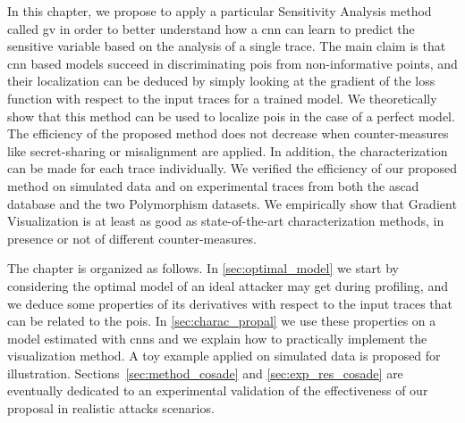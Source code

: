 In this chapter, we propose to apply a particular Sensitivity Analysis method called \gls{gv} in order to better understand how a \gls{cnn} can learn to predict the sensitive variable based on the analysis of a single trace.
The main claim is that \gls{cnn} based models succeed in discriminating \glspl{poi} from non-informative points, and their localization can be deduced by simply looking at the gradient of the loss function with respect to the input traces for a trained model.
We theoretically show that this method can be used to localize \glspl{poi} in the case of a perfect model.
The efficiency of the proposed method does not decrease when counter-measures like secret-sharing or misalignment are applied.
In addition, the characterization can be made for each trace individually. 
We verified the efficiency of our proposed method on simulated data and on experimental traces from both the \gls{ascad} database and the two Polymorphism datasets.
We empirically show that Gradient Visualization is at least as good as state-of-the-art characterization methods, in presence or not of different counter-measures.

The chapter is organized as follows. 
In \autoref{sec:optimal_model} we start by considering the optimal model of an ideal attacker may get during profiling, and we deduce some properties of its derivatives with respect to the input traces that can be related to the \glspl{poi}. 
In \autoref{sec:charac_propal} we use these properties on a model estimated with \glspl{cnn} and we explain how to practically implement the visualization method. 
A toy example applied on simulated data is proposed for illustration. 
Sections~\ref{sec:method_cosade} and \ref{sec:exp_res_cosade} are eventually dedicated to an experimental validation of the effectiveness of our proposal in realistic attacks scenarios.